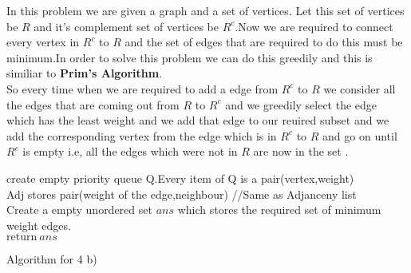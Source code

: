 \documentclass{extarticle}
\theoremstyle{remark}
\newcommand{\tbf}[1]{\textbf{#1}}
\begin{document}
In this problem we are given a graph and a set of vertices. Let this set of vertices be $R$
and it's complement set of vertices be $R^{c}$.Now we are required to connect every vertex in
$R^{c}$ to $R$ and the set of edges that are required to do this must be minimum.In order 
to solve this problem we can do this greedily and this is similiar to \tbf{Prim's Algorithm}.\\
So every time when we are required to add a edge from $R^{c}$ to $R$ we consider all the edges 
that are coming out from $R$ to $R^{c}$ and we greedily select the edge which has the least 
weight and we add that edge to our reuired subset and we add the corresponding vertex from the 
edge which is in $R^{c}$ to $R$ and go on until $R^{c}$ is empty i.e, all the edges which 
were not in $R$ are now in the set .\\
\begin{algorithm}[H]
    \SetAlgoLined
    create empty priority queue Q.Every item of Q is a pair(vertex,weight)\\
    Adj stores pair(weight of the edge,neighbour) //Same as Adjanceny list\\
    Create a empty unordered set $ans$ which stores the required set of minimum weight edges.\\
    $\text{return} ~ans$
    \caption{Algorithm for 4 b)}
    \end{algorithm}
\end{document}
